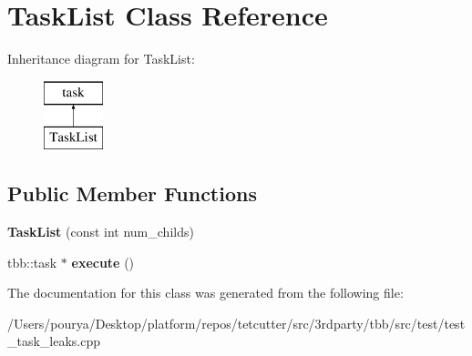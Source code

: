 \hypertarget{classTaskList}{}\section{Task\+List Class Reference}
\label{classTaskList}
Inheritance diagram for Task\+List\+:\begin{figure}[H]
\begin{center}
\leavevmode
\includegraphics[height=2.000000cm]{classTaskList}
\end{center}
\end{figure}
\subsection*{Public Member Functions}
\begin{DoxyCompactItemize}
\item 
\hypertarget{classTaskList_a15d66eb699cf0039f23340ef922409ae}{}{\bfseries Task\+List} (const int num\+\_\+childs)\label{classTaskList_a15d66eb699cf0039f23340ef922409ae}

\item 
\hypertarget{classTaskList_a73d4780cbc5a5fff13b1cb15450487c0}{}tbb\+::task $\ast$ {\bfseries execute} ()\label{classTaskList_a73d4780cbc5a5fff13b1cb15450487c0}

\end{DoxyCompactItemize}


The documentation for this class was generated from the following file\+:\begin{DoxyCompactItemize}
\item 
/\+Users/pourya/\+Desktop/platform/repos/tetcutter/src/3rdparty/tbb/src/test/test\+\_\+task\+\_\+leaks.\+cpp\end{DoxyCompactItemize}
